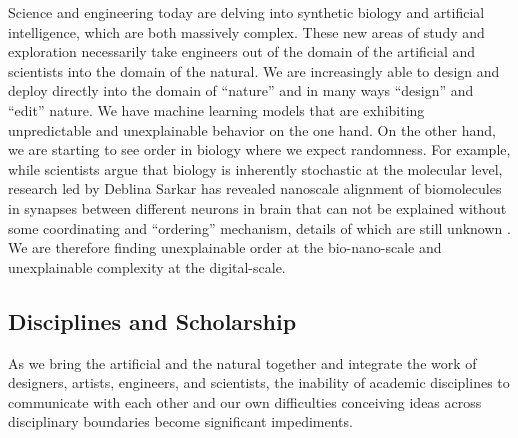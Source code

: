 Science and engineering today are delving into synthetic biology and artificial intelligence, which are both massively complex. These new areas of study and exploration necessarily take engineers out of the domain of the artificial and scientists into the domain of the natural. We are increasingly able to design and deploy directly into the domain of ``nature'' and in many ways ``design'' and ``edit'' nature. We have machine learning models that are exhibiting unpredictable and unexplainable behavior on the one hand. On the other hand, we are starting to see order in biology where we expect randomness. For example, while scientists argue that biology is inherently stochastic at the molecular level, research led by Deblina Sarkar has revealed nanoscale alignment of biomolecules in synapses between different neurons in brain that can not be explained without some coordinating and “ordering” mechanism, details of which are still unknown \cite{Sarkar2018}. We are therefore finding unexplainable order at the bio-nano-scale and unexplainable complexity at the digital-scale.

\subsection{Disciplines and Scholarship}
\label{intro:disciplines}

As we bring the artificial and the natural together and integrate the work of designers, artists, engineers, and scientists, the inability of academic disciplines to communicate with each other and our own difficulties conceiving ideas across disciplinary boundaries become significant impediments.

